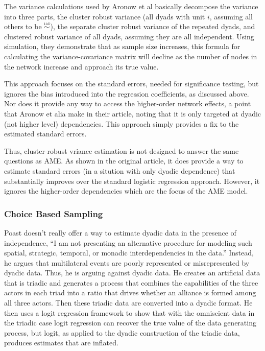The variance calculations used by Aronow et al basically decompose the variance into three parts, the cluster robust variance (all dyads with unit $i$, assuming all others to be 
$\simiid$), the separate cluster robust variance of the repeated dyads, and clustered robust variance of all dyads, assuming they are all independent.  Using simulation, they demonstrate that as sample size increases, this formula for calculating the variance-covariance matrix will decline as the number of nodes in the network increase and approach its true value.  

This approach focuses on the standard errors, needed for significance testing, but ignores the bias introduced into the regression coefficients, as discussed above.  Nor does it provide any way to access the higher-order network effects, a point that Aronow et alia make in their article, noting that it is only targeted at dyadic (not higher level) dependencies. This approach simply provides a fix to the estimated standard errors.  

Thus, cluster-robust vriance estimation is not designed to answer the same questions as AME.  As shown in the original article, it does provide a way to  estimate standard errors (in a sitution with only dyadic dependence) that substantially improves over the standard logistic regression approach.  However, it ignores the higher-order dependencies which are the focus of the AME model.  




\subsubsection*{Choice Based Sampling}

Poast \citeyear{poast:2010,poast:2016} doesn't really offer a way to estimate dyadic data in the presence of independence,
``I am not presenting an alternative procedure for modeling such spatial, strategic, temporal,
or monadic interdependencies in the data.'' Instead, he argues that multilateral events are poorly represented or misrepresented by dyadic data.  Thus, he is arguing against dyadic data.  He creates an artificial data that is triadic and generates a process that combines the capabilities of the three actors in each triad into a ratio that drives whether an alliance is formed among all three actors.  Then these triadic data are converted into a dyadic format. He then uses a logit regression framework to show that with the omniscient data in the triadic case logit regression can recover the true value of the data generating process, but logit, as applied to the dyadic construction of the triadic data, produces estimates that are inflated. 

